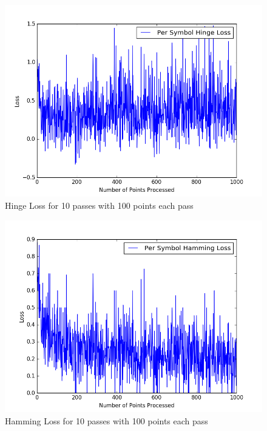 \documentclass[twoside,11pt]{article}
\theoremstyle{definition}
\begin{document}
\begin{figure}[h]
\centering
\includegraphics[width=5in]{hingeLoss1.png}
\caption{Hinge Loss for 10 passes with 100 points each pass}
\end{figure}

\begin{figure}[h]
\centering
\includegraphics[width=5in]{hammingLoss1.png}
\caption{Hamming Loss for 10 passes with 100 points each pass}
\end{figure}
\end{document}
